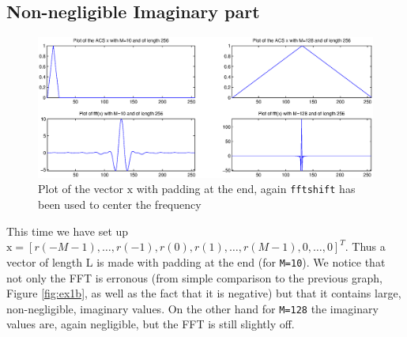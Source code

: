 \documentclass[10pt,twoside,a4paper]{report}
\begin{document}
\subsection{Non-negligible Imaginary part}
\label{sec:nonnegim}
\begin{figure}[h!]
\includegraphics[width=\textwidth]{cw1im/1c.eps}
\caption{Plot of the vector $\boldsymbol{\mathrm{x}}$ with padding at the end, again \texttt{fftshift} has been used to center the frequency}
\label{fig:acsfft2}
\end{figure}
This time we have set up $\boldsymbol{\mathrm{x}} = [r(-M-1), \dots ,r(-1),r(0),r(1), \dots ,r(M - 1),0, \dots,0]^{T}$. Thus a vector of length L is made with padding at the end (for \texttt{M=10}). We notice that not only the FFT is erronous (from simple comparison to the previous graph, Figure \ref{fig:ex1b}, as well as the fact that it is negative) but that it contains large, non-negligible, imaginary values.  On the other hand for \texttt{M=128} the imaginary values are, again negligible, but the FFT is still slightly off.
\end{document}
